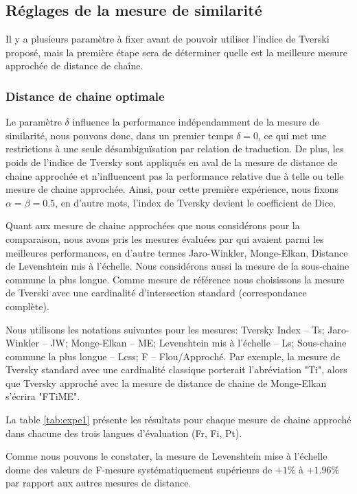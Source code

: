 \documentclass[10pt,a4paper,twoside]{article}
\begin{document}
\subsection{Réglages de la mesure de similarité}

Il y a plusieurs paramètre à fixer avant de pouvoir utiliser l'indice de Tverski proposé, mais la première étape sera de déterminer quelle est la meilleure mesure approchée de distance de chaîne.

\subsubsection{Distance de chaine optimale}
 Le paramètre \(\delta\) influence la performance  indépendamment de la mesure de similarité, nous pouvons donc, dans un premier temps \(\delta=0\), ce qui met une restrictions  à une seule désambiguïsation par relation de traduction. De plus, les poids de l'indice de Tversky sont appliqués en aval de la mesure de distance de chaine approchée et n'influencent pas la performance relative due à telle ou telle mesure de chaine approchée. Ainsi, pour cette première expérience, nous fixons \(\alpha=\beta=0.5\), en d'autre mots, l'index de Tversky devient le coefficient de Dice.

Quant aux mesure de chaine approchées que nous considérons pour la comparaison, nous avons pris les mesures évaluées par  \cite{Cohen2003} qui avaient parmi les meilleures performances, en d'autre termes Jaro-Winkler, Monge-Elkan, Distance de Levenshtein mis à l'échelle. Nous considérons aussi la mesure de la sous-chaine commune la plus longue. Comme mesure de référence nous choisissons la mesure de Tverski avec une cardinalité d'intersection standard (correspondance complète).

Nous utilisons les notations suivantes pour les mesures: Tversky Index -- Ts; Jaro-Winkler -- JW; Monge-Elkan -- ME;  Levenshtein mis à l'échelle -- Ls; Sous-chaine commune la plus longue -- Lcss; F -- Flou/Approché. Par  exemple, la mesure de  Tversky standard avec une cardinalité classique porterait l'abréviation "Ti", alors que Tversky approché avec la mesure de distance de chaine de Monge-Elkan s'écrira "FTiME". 

La table \ref{tab:expe1} présente les résultats pour chaque mesure de chaine approché dans chacune des trois langues d'évaluation (Fr, Fi, Pt).

Comme nous pouvons le constater, la mesure de Levenshtein mise à l'échelle donne des valeurs de F-mesure systématiquement supérieurs de  \(+1\%\) à \(+1.96\%\) par rapport aux autres mesures de distance.
\end{document}
